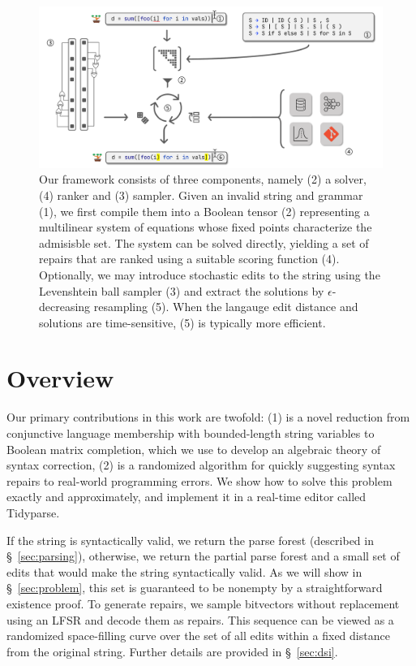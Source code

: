 \documentclass[sigplan,review,anonymous,acmsmall]{acmart}\settopmatter{printfolios=false,printccs=false,printacmref=false}
\begin{document}
\begin{figure}[H]
  \centering
  \includegraphics[width=\linewidth]{../figures/architecture_overview.pdf}
  \caption{Our framework consists of three components, namely (2) a solver, (4) ranker and (3) sampler. Given an invalid string and grammar (1), we first compile them into a Boolean tensor (2) representing a multilinear system of equations whose fixed points characterize the admisisble set. The system can be solved directly, yielding a set of repairs that are ranked using a suitable scoring function (4). Optionally, we may introduce stochastic edits to the string using the Levenshtein ball sampler (3) and extract the solutions by $\epsilon$-decreasing resampling (5). When the langauge edit distance and solutions are time-sensitive, (5) is typically more efficient.}
  \label{fig:overview}
\end{figure}

\section{Overview}

Our primary contributions in this work are twofold: (1) is a novel reduction from conjunctive language membership with bounded-length string variables to Boolean matrix completion, which we use to develop an algebraic theory of syntax correction, (2) is a randomized algorithm for quickly suggesting syntax repairs to real-world programming errors. We show how to solve this problem exactly and approximately, and implement it in a real-time editor called Tidyparse.

If the string is syntactically valid, we return the parse forest (described in \S~\ref{sec:parsing}), otherwise, we return the partial parse forest and a small set of edits that would make the string syntactically valid. As we will show in \S~\ref{sec:problem}, this set is guaranteed to be nonempty by a straightforward existence proof. To generate repairs, we sample bitvectors without replacement using an LFSR and decode them as repairs. This sequence can be viewed as a randomized space-filling curve over the set of all edits within a fixed distance from the original string. Further details are provided in \S~\ref{sec:dsi}.
\end{document}

